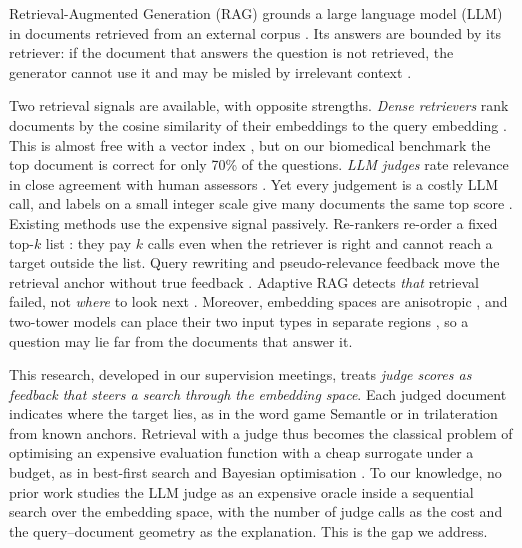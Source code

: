
Retrieval-Augmented Generation (RAG) grounds a large language model (LLM) in documents retrieved from an external corpus \citep{lewis2020rag,gao2023ragsurvey}. Its answers are bounded by its retriever: if the document that answers the question is not retrieved, the generator cannot use it and may be misled by irrelevant context \citep{shi2023distractors}.

Two retrieval signals are available, with opposite strengths. \emph{Dense retrievers} rank documents by the cosine similarity of their embeddings to the query embedding \citep{karpukhin2020dpr,reimers2019sbert}. This is almost free with a vector index \citep{malkov2020hnsw}, but on our biomedical benchmark the top document is correct for only 70\% of the questions. \emph{LLM judges} rate relevance in close agreement with human assessors \citep{thomas2024llmjudge}. Yet every judgement is a costly LLM call, and labels on a small integer scale give many documents the same top score \citep{zhuang2024beyond}. Existing methods use the expensive signal passively. Re-rankers re-order a fixed top-$k$ list \citep{nogueira2019passage,sun2023rankgpt}: they pay $k$ calls even when the retriever is right and cannot reach a target outside the list. Query rewriting and pseudo-relevance feedback move the retrieval anchor without true feedback \citep{rocchio1971relevance,gao2023hyde}. Adaptive RAG detects \emph{that} retrieval failed, not \emph{where} to look next \citep{yan2024crag}. Moreover, embedding spaces are anisotropic \citep{ethayarajh2019contextual}, and two-tower models can place their two input types in separate regions \citep{liang2022modalitygap}, so a question may lie far from the documents that answer it.

This research, developed in our supervision meetings, treats \emph{judge scores as feedback that steers a search through the embedding space}. Each judged document indicates where the target lies, as in the word game Semantle or in trilateration from known anchors. Retrieval with a judge thus becomes the classical problem of optimising an expensive evaluation function with a cheap surrogate under a budget, as in best-first search \citep{pearl1984heuristics} and Bayesian optimisation \citep{shahriari2016bayesopt}. To our knowledge, no prior work studies the LLM judge as an expensive oracle inside a sequential search over the embedding space, with the number of judge calls as the cost and the query--document geometry as the explanation. This is the gap we address.
